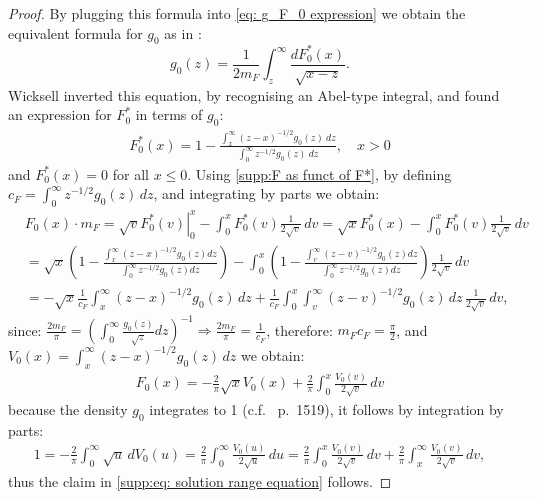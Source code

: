 \begin{proof}
    By plugging this formula into \eqref{eq: g_F_0 expression} we obtain the equivalent formula for $g_0$ as in \cite{27}: 
    $$
    g_0(z)=\frac{1}{2 m_F} \int_z^{\infty} \frac{d F^*_0(x)}{\sqrt{x-z}}.
    $$
    Wicksell \cite{14} inverted this equation, by recognising an Abel-type integral, and found an expression for $F^*_0$ in terms of $g_0$:
    \begin{align}\label{supp:eq: inv}
    F_0^*(x)=1-\frac{\int_x^{\infty}(z-x)^{-1 / 2} g_0(z) \: dz}{\int_0^{\infty} z^{-1 / 2}g_0(z) \: dz}, \quad x>0
    \end{align}
    and $F_0^*(x) = 0$ for all $x \leq 0$. Using \eqref{supp:F as funct of F*}, by defining $c_F = \int_0^{\infty} z^{-1 / 2} g_0(z) \, d z$, and integrating by parts we obtain:
    \begin{align*}
    &F_0(x) \cdot m_F=\left.\sqrt{v} F_0^*(v)\right|_0^x-\int_0^x F_0^*(v) \frac{1}{2 \sqrt{v}} \, d v=\sqrt{x} F_0^*(x)-\int_0^x F_0^*(v) \frac{1}{2 \sqrt{v}} \, d v  \\
    &=\sqrt{x}\left(1-\frac{\int_x^{\infty}(z-x)^{-1 / 2} g_0(z) d z}{\int_0^{\infty} z^{-1 / 2} g_0(z) d z}\right) -\int_0^x\left(1-\frac{\int_v^{\infty}(z-v)^{-1 / 2} g_0(z) d z}{\int_0^{\infty} z^{-1 / 2} g_0(z) d z}\right) \frac{1}{2 \sqrt{v}} \, d v\\
    &=-\sqrt{x} \frac{1}{c_F} \int_x^{\infty}(z-x)^{-1 / 2} g_0(z) \, d z + \frac{1}{c_F} \int_0^x \int_v^{\infty}(z-v)^{-1 / 2} g_0(z) \, d z \, \frac{1}{2 \sqrt{v}} \, d v,
    \end{align*}
    since:
    $\frac{2 m_F}{\pi}=(\int_0^{\infty} \frac{g_0(z)}{\sqrt{z}} d z)^{-1} \Rightarrow \frac{2 m_F}{\pi}=\frac{1}{c_F}$, therefore: $m_F c_F=\frac{\pi}{2}$, and $V_0(x) = \int_x^{\infty}(z-x)^{-1 / 2} g_0(z) \, d z$ we obtain:
    \begin{align*}
        F_0(x) = - \frac{2}{\pi} \sqrt{x} V_0(x) + \frac{2}{\pi} \int_0^x \frac{V_0(v)}{2\sqrt{v}} \, dv
    \end{align*} 
    because the density $g_0$ integrates to 1 (c.f.\ \cite{1} p.\ 1519), it follows by integration by parts:
    \begin{align*}
        1 = -\frac{2}{\pi} \int_0^{\infty} \sqrt{u} \, dV_0(u) = \frac{2}{\pi} \int_0^{\infty} \frac{V_0(u)}{2\sqrt{u}} \, du = \frac{2}{\pi} \int_0^x \frac{V_0(v)}{2\sqrt{v}} \, dv + \frac{2}{\pi} \int_x^{\infty} \frac{V_0(v)}{2\sqrt{v}} \, dv,
    \end{align*}	
    thus the claim in \eqref{supp:eq: solution range equation} follows.
\end{proof}

